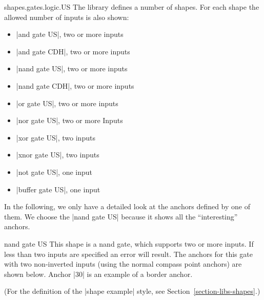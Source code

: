\begin{pgflibrary}{shapes.gates.logic.US}
    The library defines a number of shapes. For each shape the allowed number
    of inputs is also shown:
    \begin{itemize}
        \item |and gate US|, two or more inputs
        \item |and gate CDH|, two or more inputs
        \item |nand gate US|, two or more inputs
        \item |nand gate CDH|, two or more inputs
        \item |or gate US|, two or more inputs
        \item |nor gate US|, two or more Inputs
        \item |xor gate US|, two inputs
        \item |xnor gate US|, two inputs
        \item |not gate US|, one input
        \item |buffer gate US|, one input
    \end{itemize}

    In the following, we only have a detailed look at the anchors defined by
    one of them. We choose the |nand gate US| because it shows all the
    ``interesting'' anchors.

    \begin{shape}{nand gate US}
        This shape is a nand gate, which supports two or more inputs. If less
        than two inputs are specified an error will result. The anchors for
        this gate with two non-inverted inputs (using the normal compass point
        anchors) are shown below. Anchor |30| is an example of a border anchor.
\begin{codeexample}[preamble={\usetikzlibrary{circuits.logic.US}}]
\Huge
{}
\end{codeexample}

        (For the definition of the |shape example| style, see
        Section~\ref{section-libs-shapes}.)
    \end{shape}
\end{pgflibrary}


